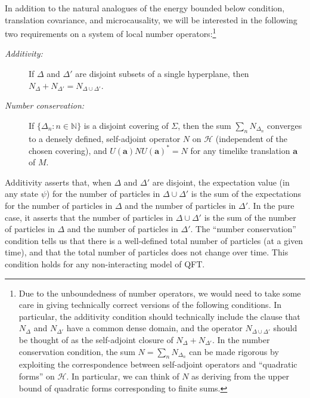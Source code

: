 \documentclass[12pt]{article}
\theoremstyle{remark}
\newcommand{\hil}[1]{\mathcal{#1}}
\begin{document}
In addition to the natural analogues of the energy bounded below
condition, translation covariance, and microcausality, we will be
interested in the following two requirements on a system of local
number operators:\footnote{Due to the unboundedness of number
  operators, we would need to take some care in giving technically
  correct versions of the following conditions.  In particular, the
  additivity condition should technically include the clause that
  $N_{\Delta}$ and $N_{\Delta '}$ have a common dense domain, and the
  operator $N_{\Delta \cup \Delta '}$ should be thought of as the
  self-adjoint closure of $N_{\Delta}+N_{\Delta '}$.  In the number
  conservation condition, the sum $N=\sum _{n}N_{\Delta _{n}}$ can be
  made rigorous by exploiting the correspondence between self-adjoint
  operators and ``quadratic forms'' on $\hil{H}$.  In particular, we
  can think of $N$ as deriving from the upper bound of quadratic forms
  corresponding to finite sums.}
\begin{description}
\item[{\it Additivity:}] If $\Delta$ and $\Delta '$ are disjoint
  subsets of a single hyperplane, then \newline $N_{\Delta}+N_{\Delta
    '}=N_{\Delta \cup \Delta '}$.
\item[{\it Number conservation:}] If $\{ \Delta _{n}:n\in \mathbb{N}
  \}$ is a disjoint covering of $\Sigma$, then the sum $\sum
  _{n}N_{\Delta _{n}}$ converges to a densely defined, self-adjoint
  operator $N$ on $\hil{H}$ (independent of the chosen covering), and
  $U(\mathbf{a})NU(\mathbf{a})^{*}=N$ for any timelike translation
  $\mathbf{a}$ of $M$.
\end{description}
Additivity asserts that, when $\Delta$ and $\Delta '$ are disjoint,
the expectation value (in any state $\psi$) for the number of
particles in $\Delta \cup \Delta '$ is the sum of the expectations for
the number of particles in $\Delta$ and the number of particles in
$\Delta '$.  In the pure case, it asserts that the number of particles
in $\Delta \cup \Delta '$ is the sum of the number of particles in
$\Delta$ and the number of particles in $\Delta '$.  The ``number
conservation'' condition tells us that there is a well-defined total
number of particles (at a given time), and that the total number of
particles does not change over time.  This condition holds for any
non-interacting model of QFT.  
\end{document}
